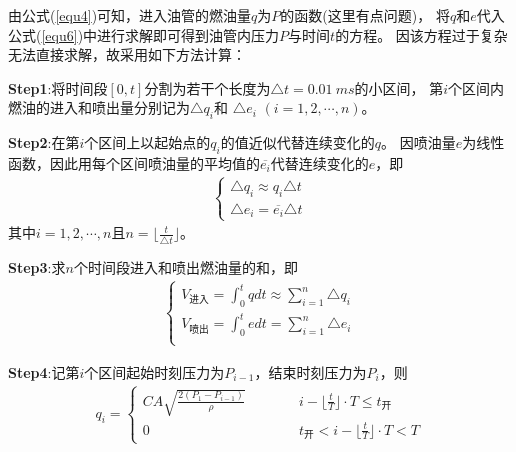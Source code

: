 \documentclass[withoutpreface,bwprint]{cumcmthesis} %
\begin{document}
    由公式(\ref{equ4})可知，进入油管的燃油量$q$为$P$的函数({\color{red}这里有点问题})，
    将$q$和$e$代入公式(\ref{equ6})中进行求解即可得到油管内压力$P$与时间$t$的方程。
    因该方程过于复杂无法直接求解，故采用如下方法计算：
    
    \textbf{Step1}:将时间段$[0,t]$分割为若干个长度为$\triangle t=0.01~ms$的小区间，
    第$i$个区间内燃油的进入和喷出量分别记为$\triangle q_i$和 $\triangle e_i$
    $(i=1,2,\cdots,n)$。

    \textbf{Step2}:在第$i$个区间上以起始点的$q_i$的值近似代替连续变化的$q$。
    因喷油量$e$为线性函数，因此用每个区间喷油量的平均值的$\overline{e_i}$代替连续变化的$e$，即
    \begin{eqnarray}
        \begin{cases}
            \triangle q_i \approx q_i\triangle t\\
            \triangle e_i = \overline{e_i}\triangle t
        \end{cases}
    \label{equ8}
    \end{eqnarray}
    其中$i=1,2,\cdots,n$且$n=\lfloor{\frac{t}{\triangle t}}\rfloor$。
    
    \textbf{Step3}:求$n$个时间段进入和喷出燃油量的和，即
    \begin{eqnarray}
        \begin{cases}
            V_{\text{进入}}=\int_0^t q dt \approx
             \sum\limits_{i=1}^n \triangle q_i \\
            V_{\text{喷出}}=\int_0^t e dt =
             \sum\limits_{i=1}^n \triangle e_i \\
        \end{cases}
    \label{equ9}
    \end{eqnarray}

    \textbf{Step4}:记第$i$个区间起始时刻压力为$P_{i-1}$，结束时刻压力为$P_i$，则
    \begin{eqnarray}
        q_i=
        \begin{cases}
        CA\sqrt{\frac{2(P_1-P_{i-1})}{\rho}} \quad \quad  \quad
        & i-\lfloor{\frac{t}{T}}\rfloor \cdot T \leq t_{\text{开}}\\
        0 & t_{\text{开}} < i-\lfloor{\frac{t}{T}}\rfloor \cdot T < T
        \end{cases}
    \label{equ10}
    \end{eqnarray}
\end{document}
